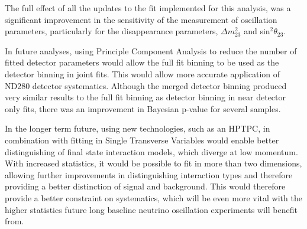 The full effect of all the updates to the fit implemented for this analysis, was a significant improvement in the sensitivity of the measurement of oscillation parameters, particularly for the disappearance parameters, $\Delta m^{2}_{23}$ and sin$^2 \theta_{23}$. 

In future analyses, using Principle Component Analysis to reduce the number of fitted detector parameters would allow the full fit binning to be used as the detector binning in joint fits. This would allow more accurate application of ND280 detector systematics. Although the merged detector binning produced very similar results to the full fit binning as detector binning in near detector only fits, there was an improvement in Bayesian p-value for several samples. 

In the longer term future, using new technologies, such as an HPTPC, in combination with fitting in Single Transverse Variables would enable better distinguishing of final state interaction models, which diverge at low momentum. With increased statistics, it would be possible to fit in more than two dimensions, allowing further improvements in distinguishing interaction types and therefore providing a better distinction of signal and background. This would therefore provide a better constraint on systematics, which will be even more vital with the higher statistics future long baseline neutrino oscillation experiments will benefit from. 

\newpage